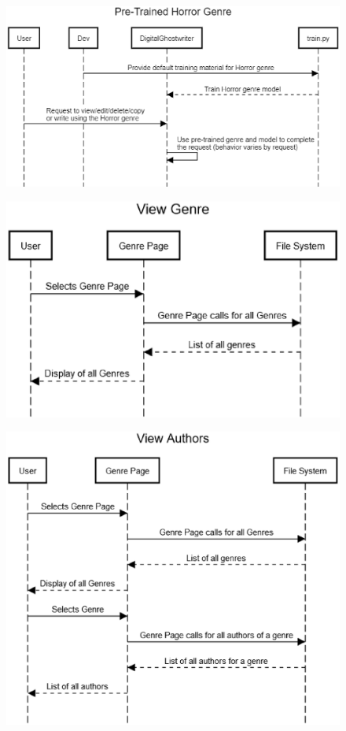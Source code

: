 \documentclass[12pt]{article}
\begin{document}
\newpage

\begin{figure}[ht]
  \centering
    \includegraphics[scale=0.6]{Horror.eps}
\end{figure}

\newpage 

\begin{figure}[ht]
  \centering
    \includegraphics[scale=0.7]{Genre.eps}
\end{figure}

\begin{figure}[ht]
  \centering
    \includegraphics[scale=0.7]{Author.eps}
\end{figure}
\end{document}
